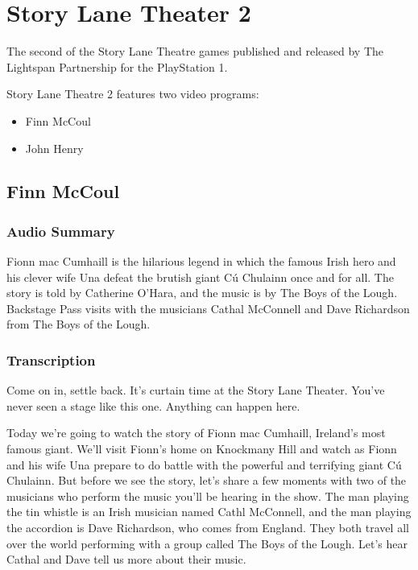 \chapter{Story Lane Theater 2}


The second of the Story Lane Theatre games published and released by The Lightspan Partnership for the PlayStation 1.

Story Lane Theatre 2 features two video programs:

\begin{itemize}
    \item Finn McCoul
    \item John Henry
\end{itemize}

\clearpage
\newpage

\section{Finn McCoul}

\subsection{Audio Summary}

Fionn mac Cumhaill is the hilarious legend in which the famous Irish hero and his clever wife Una defeat the brutish giant Cú Chulainn once and for all. The story is told by Catherine O'Hara, and the music is by The Boys of the Lough. Backstage Pass visits with the musicians Cathal McConnell and Dave Richardson from The Boys of the Lough.

\subsection{Transcription}

Come on in, settle back. It's curtain time at the Story Lane Theater. You've never seen a stage like this one. Anything can happen here.

Today we're going to watch the story of Fionn mac Cumhaill, Ireland's most famous giant. We'll visit Fionn's home on Knockmany Hill and watch as Fionn and his wife Una prepare to do battle with the powerful and terrifying giant Cú Chulainn. But before we see the story, let's share a few moments with two of the musicians who perform the music you'll be hearing in the show. The man playing the tin whistle is an Irish musician named Cathl McConnell, and the man playing the accordion is Dave Richardson, who comes from England. They both travel all over the world performing with a group called The Boys of the Lough. Let's hear Cathal and Dave tell us more about their music.

